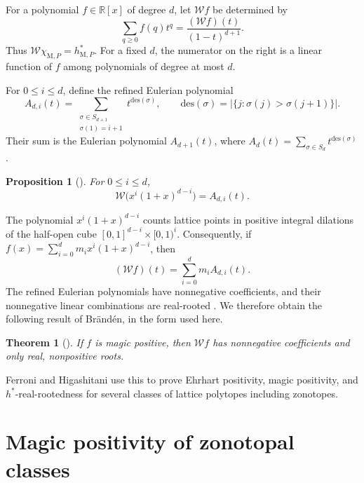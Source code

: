 \documentclass[11pt,a4paper,reqno]{amsart}
\theoremstyle{results}
\newtheorem{proposition}[thm]{Proposition}
\theoremstyle{definitions}
\def\R{\mathbb{R}}
\newcommand{\M}{\mathrm{M}}
\newcommand{\des}{\mathrm{des}}
\newtheorem{theorem}[thm]{Theorem}
\newcommand{\hstar}{h^{*}}
\newcommand{\W}{\mathcal{W}}      %
\begin{document}
For a polynomial $f\in\R[x]$ of degree $d$, let $\W f$ be determined by
\begin{equation}\label{eq:W}
 \sum_{q\geqslant0}f(q)t^q=\frac{(\W f)(t)}{(1-t)^{d+1}}.
\end{equation}
Thus $\W\chi_{\M,P}=\hstar_{\M,P}$. For a fixed $d$, the numerator on the
right is a linear function of $f$ among polynomials of degree at most $d$.

For $0\leqslant i\leqslant d$, define the refined Eulerian polynomial
\[
 A_{d,i}(t)=\sum_{\substack{\sigma\in S_{d+1}\\\sigma(1)=i+1}}
 t^{\des(\sigma)},
 \qquad
 \des(\sigma)=\big|\{j:\sigma(j)>\sigma(j+1)\}\big|.
\]
Their sum is the Eulerian polynomial $A_{d+1}(t)$, where
$A_d(t)=\sum_{\sigma\in S_d}t^{\des(\sigma)}$.

\begin{proposition}[{\cite[Theorem 4.2]{beck2019h}}]\label{prop:halfopen}
For $0\leqslant i\leqslant d$,
\[
 \W\big(x^i(1+x)^{d-i}\big)=A_{d,i}(t).
\]
\end{proposition}

The polynomial $x^i(1+x)^{d-i}$ counts lattice points in positive integral
dilations of the half-open cube $[0,1]^{d-i}\times[0,1)^i$.
Consequently, if $f(x)=\sum_{i=0}^d m_i x^i(1+x)^{d-i}$, then
\begin{equation}\label{eq:hstar-first-letter}
 (\W f)(t)=\sum_{i=0}^d m_i A_{d,i}(t).
\end{equation}
The refined Eulerian polynomials have nonnegative coefficients, and their
nonnegative linear combinations are real-rooted
\cite[Theorem 3.1 and Corollary 4.5]{beck2019h}. We therefore obtain the
following result of Br\"and\'en, in the form used here.

\begin{theorem}[{\cite[Corollary 4.5]{beck2019h}}]\label{thm:magic-rr}
If $f$ is magic positive, then $\W f$ has nonnegative coefficients and only
real, nonpositive roots.
\end{theorem}

Ferroni and Higashitani use this to prove Ehrhart positivity, magic positivity, and $\hstar$-real-rootedness for several classes of lattice polytopes
\cite[Theorem 4.19 and Remark 4.21]{ferroni2024examples} including zonotopes.

\section{Magic positivity of zonotopal classes}
\label{sec:proof}
\end{document}
